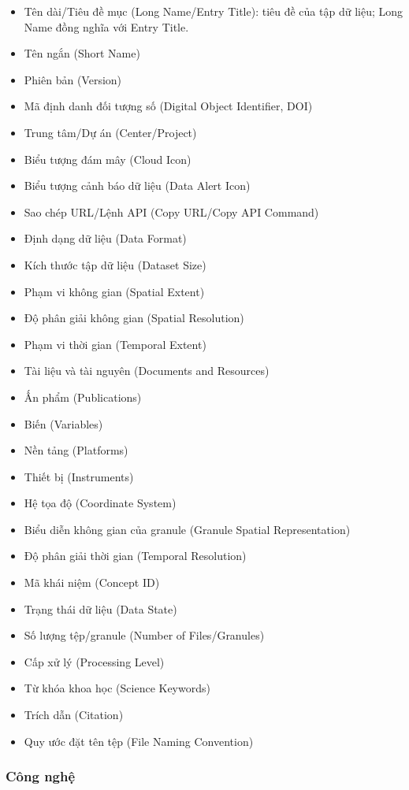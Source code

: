 \begin{itemize}
\item
  Tên dài/Tiêu đề mục (Long Name/Entry Title): tiêu đề của tập dữ liệu; Long Name đồng nghĩa với Entry Title.
\item
  Tên ngắn (Short Name)
\item
  Phiên bản (Version)
\item
  Mã định danh đối tượng số (Digital Object Identifier, DOI)
\item
  Trung tâm/Dự án (Center/Project)
\item
  Biểu tượng đám mây (Cloud Icon)
\item
  Biểu tượng cảnh báo dữ liệu (Data Alert Icon)
\item
  Sao chép URL/Lệnh API (Copy URL/Copy API Command)
\item
  Định dạng dữ liệu (Data Format)
\item
  Kích thước tập dữ liệu (Dataset Size)
\item
  Phạm vi không gian (Spatial Extent)
\item
  Độ phân giải không gian (Spatial Resolution)
\item
  Phạm vi thời gian (Temporal Extent)
\item
  Tài liệu và tài nguyên (Documents and Resources)
\item
  Ấn phẩm (Publications)
\item
  Biến (Variables)
\item
  Nền tảng (Platforms)
\item
  Thiết bị (Instruments)
\item
  Hệ tọa độ (Coordinate System)
\item
  Biểu diễn không gian của granule (Granule Spatial Representation)
\item
  Độ phân giải thời gian (Temporal Resolution)
\item
  Mã khái niệm (Concept ID)
\item
  Trạng thái dữ liệu (Data State)
\item
  Số lượng tệp/granule (Number of Files/Granules)
\item
  Cấp xử lý (Processing Level)
\item
  Từ khóa khoa học (Science Keywords)
\item
  Trích dẫn (Citation)
\item
  Quy ước đặt tên tệp (File Naming Convention)
\end{itemize}

\subsubsection{Công nghệ}

